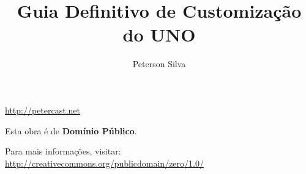 \documentclass[a5paper,10pt]{book}
\title{Guia Definitivo de Customização do UNO}
\author{Peterson Silva}
\date{}
\begin{document}
\maketitle

\begin{center}
\url{http://petercast.net}
\end{center}

\vfill

\begin{center}
Esta obra é de \textbf{Domínio Público}.
\end{center}

\begin{figure}[!h]
\centering
{}
\end{figure}

\begin{center}
Para mais informações, visitar: \\

\url{http://creativecommons.org/publicdomain/zero/1.0/}
\end{center}




\tableofcontents













\newpage

\vspace{5cm}
\end{document}
